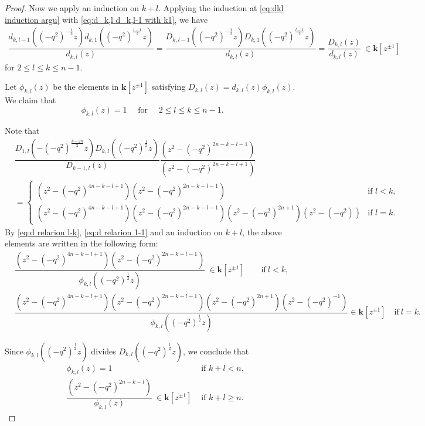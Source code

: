 \documentclass[11pt, leqno]{amsart}
\theoremstyle{definition}
\numberwithin{equation}{section}
\begin{document}
\begin{proof}
Now we apply an induction on $k+l$.
Applying the induction at \eqref{eq:dkl induction argu} with \eqref{eq:d_k,l d_k,l-1 with k1},
we have \begin{align*}
  \dfrac{d_{k,l-1}({(-q^2)}^{-\frac{1}{2}}z)d_{k,1}({(-q^2)}^{\frac{l-1}{2}}z)}{d_{k,l}(z) }
  =\dfrac{D_{k,l-1}({(-q^2)}^{-\frac{1}{2}}z)D_{k,1}({(-q^2)}^{\frac{l-1}{2}}z) }{d_{k,l}(z) }
  =\dfrac{{D_{k,l}}(z)}{d_{k,l}(z)} \
   \in {\mathbf{k}}[z^{\pm 1}]
\end{align*}
for $2 \le l \le  k \le n-1$.

\medskip

Let $\phi_{k,l}(z)$ be the elements in ${\mathbf{k}}[z^{\pm 1}]$ satisfying ${D_{k,l}}(z) = d_{k,l}(z)
\phi_{k,l}(z)$. We claim that
$$ \phi_{k,l}(z)=1 \quad \text{ for } \quad 2 \le l
\leq k \le n-1.$$

Note that
\begin{align*}
  &\dfrac{D_{1,l}(-{(-q^2)}^{\frac{k-2n}{2}}z){D_{k,l}}({(-q^2)}^{\frac{1}{2}}z) }{D_{k-1,l}(z)}
  \dfrac{ (z^2-{(-q^2)}^{2n-k-l-1} ) }{( z^2-{(-q^2)}^{2n-k-l+1}) }  \\
  &=\begin{cases}
(z^2-{(-q^2)}^{4n-k-l+1})(z^2-{(-q^2)}^{2n-k-l-1}) & \text{if $l < k$,}\\[1.5ex]
 (z^2-{(-q^2)}^{4n-k-l+1})(z^2-{(-q^2)}^{2n-k-l-1})(z^2-{(-q^2)}^{2n+1})(z^2-{(-q^2)})
 & \text{if $l=k$.}
   \end{cases}
\end{align*}
By \eqref{eq:d relarion l-k}, \eqref{eq:d relarion 1-1} and an induction on $k+l$, the above elements are written in the following form:
\begin{align*}
&\dfrac{(z^2-{(-q^2)}^{4n-k-l+1})(z^2-{(-q^2)}^{2n-k-l-1})}{\phi_{k,l}({(-q^2)}^{\frac{1}{2}}z)} \ \in  {\mathbf{k}}[z^{\pm 1}] \qquad \text{if} \ l < k,\\
&\dfrac{(z^2-{(-q^2)}^{4n-k-l+1})(z^2-{(-q^2)}^{2n-k-l-1})
(z^2-{(-q^2)}^{2n+1})(z^2-{(-q^2)}^{-1})}{\phi_{k,l}({(-q^2)}^{\frac{1}{2}}z)} \in  {\mathbf{k}}[z^{\pm 1}]
 \quad \text{if} \ l=k.
\end{align*}

Since $\phi_{k,l}({(-q^2)}^{\frac{1}{2}}z)$ divides
${D_{k,l}}({(-q^2)}^{\frac{1}{2}}z)$,
we conclude that
\begin{align}
& \phi_{k,l}(z) = 1 & \text{ if }  k+l <n, \nonumber \\
& \dfrac{(z^2-{(-q^2)}^{2n-k-l})}{\phi_{k,l}(z)} \ \in
{\mathbf{k}}[z^{\pm 1}]
& \text{ if }  k+l \ge n. \label{eq:psi D}
\end{align}


\end{proof}
\end{document}
